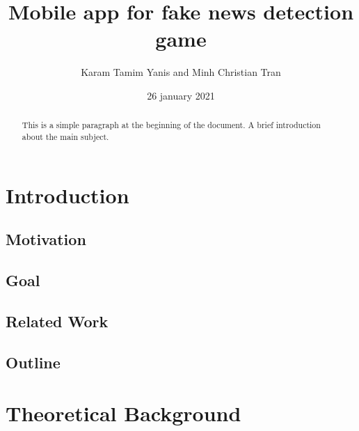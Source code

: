 \documentclass[12pt, letterpaper, twoside]{article}
\title{Mobile app for fake news detection game}
\author{Karam Tamim Yanis and Minh Christian Tran}
\date{26 january 2021}
\begin{document}
\begin{titlepage}
\maketitle
\end{titlepage}

\begin{abstract}
This is a simple paragraph at the beginning of the 
document. A brief introduction about the main subject.
\end{abstract}

\newpage

\tableofcontents


\section{Introduction}
\subsection{Motivation}
\subsection{Goal}
\subsection{Related Work}
\subsection{Outline}

\section{Theoretical Background}
\end{document}

